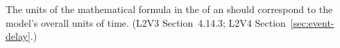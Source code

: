 The units of the mathematical formula in the  of an \Event
should correspond to the model's overall units of time.  (L2V3
Section~4.14.3; L2V4 Section~\ref{sec:event-delay}.)

